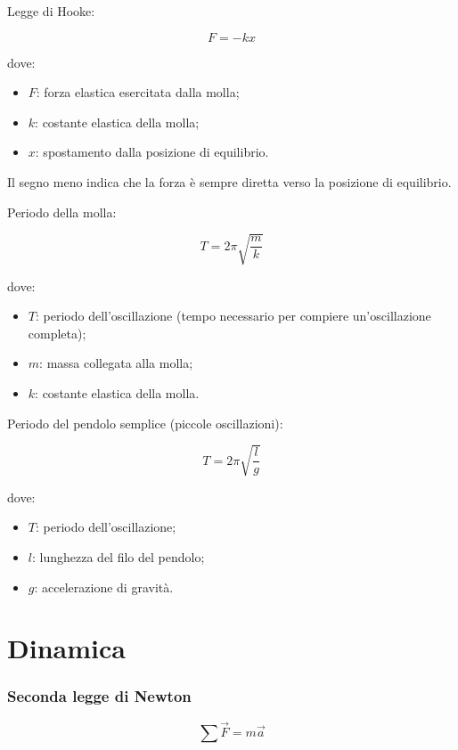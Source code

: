 Legge di Hooke:

\[
F=-kx
\]

\noindent dove:

\begin{itemize}
\item $F$: forza elastica esercitata dalla molla;
\item $k$: costante elastica della molla;
\item $x$: spostamento dalla posizione di equilibrio.
\end{itemize}

\noindent Il segno meno indica che la forza è sempre diretta verso la posizione di equilibrio.

\vspace{0.2cm}

\noindent Periodo della molla:

\[
T=2\pi\sqrt{\frac{m}{k}}
\]

\noindent dove:

\begin{itemize}
\item $T$: periodo dell'oscillazione (tempo necessario per compiere un'oscillazione completa);
\item $m$: massa collegata alla molla;
\item $k$: costante elastica della molla.
\end{itemize}

\vspace{0.2cm}

\noindent Periodo del pendolo semplice (piccole oscillazioni):

\[
T=2\pi\sqrt{\frac{l}{g}}
\]

\noindent dove:

\begin{itemize}
\item $T$: periodo dell'oscillazione;
\item $l$: lunghezza del filo del pendolo;
\item $g$: accelerazione di gravità.
\end{itemize}
\chapter{Dinamica}
\subsection{Seconda legge di Newton}

\[
\boxed{\sum \vec{F}=m\vec{a}}
\]

